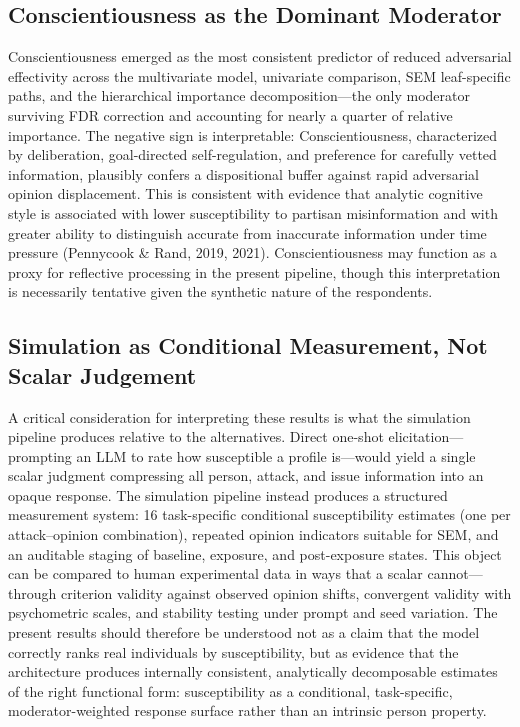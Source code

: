 \documentclass[11pt]{article}
\begin{document}
\subsection{Conscientiousness as the Dominant Moderator}
Conscientiousness emerged as the most consistent predictor of reduced adversarial effectivity across the multivariate model, univariate comparison, SEM leaf-specific paths, and the hierarchical importance decomposition---the only moderator surviving FDR correction and accounting for nearly a quarter of relative importance.
The negative sign is interpretable: Conscientiousness, characterized by deliberation, goal-directed self-regulation, and preference for carefully vetted information, plausibly confers a dispositional buffer against rapid adversarial opinion displacement.
This is consistent with evidence that analytic cognitive style is associated with lower susceptibility to partisan misinformation and with greater ability to distinguish accurate from inaccurate information under time pressure (Pennycook \& Rand, 2019, 2021).
Conscientiousness may function as a proxy for reflective processing in the present pipeline, though this interpretation is necessarily tentative given the synthetic nature of the respondents.

\subsection{Simulation as Conditional Measurement, Not Scalar Judgement}
A critical consideration for interpreting these results is what the simulation pipeline produces relative to the alternatives.
Direct one-shot elicitation---prompting an LLM to rate how susceptible a profile is---would yield a single scalar judgment compressing all person, attack, and issue information into an opaque response.
The simulation pipeline instead produces a structured measurement system: 16 task-specific conditional susceptibility estimates (one per attack--opinion combination), repeated opinion indicators suitable for SEM, and an auditable staging of baseline, exposure, and post-exposure states.
This object can be compared to human experimental data in ways that a scalar cannot---through criterion validity against observed opinion shifts, convergent validity with psychometric scales, and stability testing under prompt and seed variation.
The present results should therefore be understood not as a claim that the model correctly ranks real individuals by susceptibility, but as evidence that the architecture produces internally consistent, analytically decomposable estimates of the right functional form: susceptibility as a conditional, task-specific, moderator-weighted response surface rather than an intrinsic person property.
\end{document}
